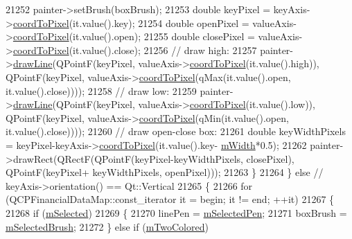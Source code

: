 \begin{DoxyCode}
21252       painter->setBrush(boxBrush);
21253       \textcolor{keywordtype}{double} keyPixel = keyAxis->\hyperlink{class_q_c_p_axis_a985ae693b842fb0422b4390fe36d299a}{coordToPixel}(it.value().key);
21254       \textcolor{keywordtype}{double} openPixel = valueAxis->\hyperlink{class_q_c_p_axis_a985ae693b842fb0422b4390fe36d299a}{coordToPixel}(it.value().open);
21255       \textcolor{keywordtype}{double} closePixel = valueAxis->\hyperlink{class_q_c_p_axis_a985ae693b842fb0422b4390fe36d299a}{coordToPixel}(it.value().close);
21256       \textcolor{comment}{// draw high:}
21257       painter->\hyperlink{class_q_c_p_painter_a0b4b1b9bd495e182c731774dc800e6e0}{drawLine}(QPointF(keyPixel, valueAxis->\hyperlink{class_q_c_p_axis_a985ae693b842fb0422b4390fe36d299a}{coordToPixel}(it.value().high)), 
      QPointF(keyPixel, valueAxis->\hyperlink{class_q_c_p_axis_a985ae693b842fb0422b4390fe36d299a}{coordToPixel}(qMax(it.value().open, it.value().close))));
21258       \textcolor{comment}{// draw low:}
21259       painter->\hyperlink{class_q_c_p_painter_a0b4b1b9bd495e182c731774dc800e6e0}{drawLine}(QPointF(keyPixel, valueAxis->\hyperlink{class_q_c_p_axis_a985ae693b842fb0422b4390fe36d299a}{coordToPixel}(it.value().low)), 
      QPointF(keyPixel, valueAxis->\hyperlink{class_q_c_p_axis_a985ae693b842fb0422b4390fe36d299a}{coordToPixel}(qMin(it.value().open, it.value().close))));
21260       \textcolor{comment}{// draw open-close box:}
21261       \textcolor{keywordtype}{double} keyWidthPixels = keyPixel-keyAxis->\hyperlink{class_q_c_p_axis_a985ae693b842fb0422b4390fe36d299a}{coordToPixel}(it.value().key-
      \hyperlink{class_q_c_p_financial_af630e5eb8485146b9c777e63fd1cf993}{mWidth}*0.5);
21262       painter->drawRect(QRectF(QPointF(keyPixel-keyWidthPixels, closePixel), QPointF(keyPixel+
      keyWidthPixels, openPixel)));
21263     \}
21264   \} \textcolor{keywordflow}{else} \textcolor{comment}{// keyAxis->orientation() == Qt::Vertical}
21265   \{
21266     \textcolor{keywordflow}{for} (QCPFinancialDataMap::const\_iterator it = begin; it != end; ++it)
21267     \{
21268       \textcolor{keywordflow}{if} (\hyperlink{class_q_c_p_abstract_plottable_a43f68a0603e9bcd016bdfa6d9d5c41c9}{mSelected})
21269       \{
21270         linePen = \hyperlink{class_q_c_p_abstract_plottable_a10619472f5d5e10e9519a599f1cf5576}{mSelectedPen};
21271         boxBrush = \hyperlink{class_q_c_p_abstract_plottable_aea3c0da30c7a8be23ad5f2d9bca36762}{mSelectedBrush};
21272       \} \textcolor{keywordflow}{else} \textcolor{keywordflow}{if} (\hyperlink{class_q_c_p_financial_a6afe919190b884d9bac026cefcc8c0a8}{mTwoColored})

\end{DoxyCode}

